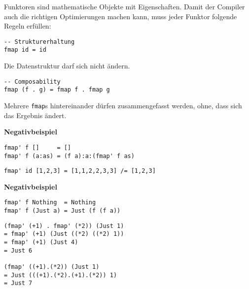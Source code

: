 \documentclass{beamer}
\begin{document}
\begin{frame}[fragile]
Funktoren sind mathematische Objekte mit Eigenschaften. Damit der Compiler auch die richtigen Optimierungen machen kann, muss jeder Funktor folgende Regeln erfüllen:\\
\pause
\begin{verbatim}
-- Strukturerhaltung
fmap id = id
\end{verbatim}
Die Datenstruktur darf sich nicht ändern.\\
\pause
\bigskip
\begin{verbatim}
-- Composability
fmap (f . g) = fmap f . fmap g
\end{verbatim}
Mehrere \texttt{fmap}s hintereinander dürfen zusammengefasst werden, ohne, dass sich das Ergebnis ändert.
\end{frame}

\begin{frame}[fragile]
\begin{important}\begin{center}\textbf{Negativbeispiel}\end{center}\end{important}
\begin{verbatim}
fmap' f []     = []
fmap' f (a:as) = (f a):a:(fmap' f as)
\end{verbatim}
\pause
\begin{verbatim}
fmap' id [1,2,3] = [1,1,2,2,3,3] /= [1,2,3]
\end{verbatim}
\end{frame}

\begin{frame}[fragile]
\begin{important}\begin{center}\textbf{Negativbeispiel}\end{center}\end{important}
\begin{verbatim}
fmap' f Nothing  = Nothing
fmap' f (Just a) = Just (f (f a))
\end{verbatim}
\pause
\begin{verbatim}
(fmap' (+1) . fmap' (*2)) (Just 1)
= fmap' (+1) (Just ((*2) ((*2) 1))
= fmap' (+1) (Just 4)
= Just 6

(fmap' ((+1).(*2)) (Just 1) 
= Just (((+1).(*2).(+1).(*2)) 1)
= Just 7
\end{verbatim}

\end{frame}

\end{document}
